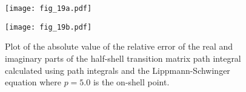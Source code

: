 \documentclass[aps,prc,reprint,noshowpacs,groupedaddress,onecolumn]{revtex4}
\begin{document}
%
\begin{figure}
\caption{Plot of the absolute value of the relative error
of the real and imaginary parts of the half-shell transition matrix
path integral calculated using path integrals and
the Lippmann-Schwinger equation where $p=5.0$ is the on-shell point.}
\begin{minipage}[t]{.45\linewidth}  
\centering
\texttt{[image: fig\_19a.pdf]}
\end{minipage}
\begin{minipage}[t]{.45\linewidth}  
\centering
\texttt{[image: fig\_19b.pdf]}
\end{minipage}
\label{figure 19}
\end{figure}  


\end{document}
